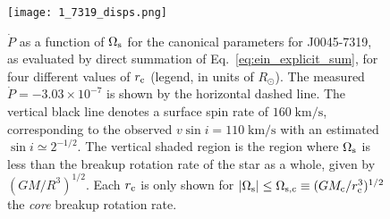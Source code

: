 \documentclass[
        fleqn,
        usenatbib,
    ]{mnras}
\newcommand*{\abs}[1]{\left|#1\right|}
\begin{document}
\begin{figure}
    \centering
    \texttt{[image: 1\_7319\_disps.png]}
    \caption{$\dot{P}$ as a function of $\Omega_{\rm s}$ for the canonical
    parameters for J0045-7319, as evaluated by direct summation of
    Eq.~\eqref{eq:ein_explicit_sum}, for four different values of $r_{\rm c}$
    (legend, in units of $R_{\odot}$). The measured $\dot{P} = -3.03\times
    10^{-7}$ is shown by the horizontal dashed line. The vertical black line
    denotes a surface spin rate of $160\;\mathrm{km/s}$, corresponding to the
    observed $v \sin i = 110\;\mathrm{km/s}$ with an estimated $\sin i \simeq
    2^{-1/2}$. The vertical shaded region is the region where $\Omega_{\rm s}$
    is less than the breakup rotation rate of the star as a whole, given by $(GM
    / R^3)^{1/2}$. Each $r_{\rm c}$ is only shown for $\abs{\Omega_{\rm s}} \leq
    \Omega_{\rm s, c} \equiv (GM_{\rm c} / r_{\rm c}^3)^{1/2}$ the \emph{core}
    breakup rotation rate.
    }\label{fig:j0045_fid}
\end{figure}


\end{document}
